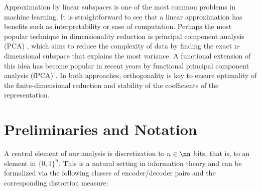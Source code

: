 \documentclass[twoside,11pt]{article}
\newcommand{\defeq}{\mathbin{:=}}
\newcommand{\fSpace}[1]{\ensuremath{\mathcal{#1}}}
\newcommand{\set}[1]{\ensuremath{\mathcal{#1}}}
\begin{document}
Approximation by linear subspaces is one of the most common problems in machine learning. It is straightforward to see that a linear approximation has benefits such as interpretability or ease of computation. Perhaps the most popular technique in dimensionality reduction is principal component analysis (PCA) \citep{Jolliffe02PrincipalComponentAnalysis}, which aims to reduce the complexity of data by finding the exact n-dimensional subspace that explains the most variance. A functional extension of this idea has become popular in recent years by functional principal component analysis (fPCA) \citep{Ramsay05FunctionalDataAnalysis}. In both approaches, orthogonality is key to ensure optimality of the finite-dimensional reduction and stability of the coefficients of the representation. 

\section{Preliminaries and Notation}

A central element of our analysis is discretization to $n\in\nn$ bits, that is, to an element in $\{0,1\}^n$.
This is a natural setting in information theory and can be formalized via the following classes of encoder/decoder pairs and the corresponding distortion measure:
\end{document}
